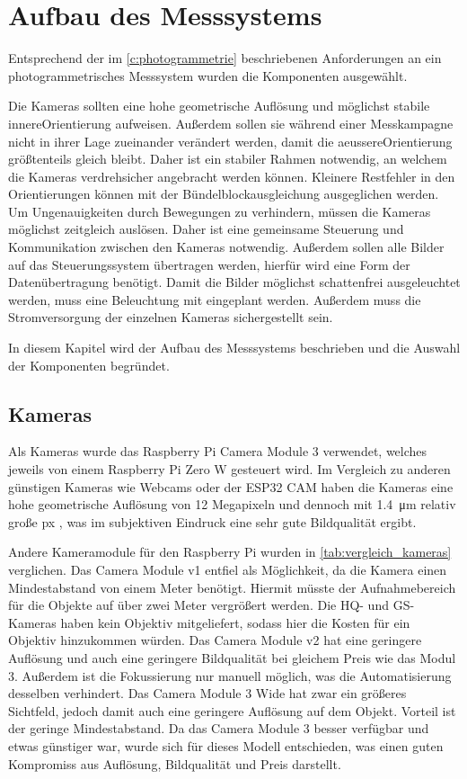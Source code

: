 \documentclass[./00PhotoBox.tex]{subfiles}
\begin{document}
\chapter{Aufbau des Messsystems}
\label{c:aufbau}
Entsprechend der im \autoref{c:photogrammetrie} beschriebenen Anforderungen an ein photogrammetrisches Messsystem wurden die Komponenten ausgewählt.

Die Kameras sollten eine hohe geometrische Auflösung und möglichst stabile \gls{innereOrientierung} aufweisen. Außerdem sollen sie während einer Messkampagne nicht in ihrer Lage zueinander verändert werden, damit die \gls{aeussereOrientierung} größtenteils gleich bleibt. Daher ist ein stabiler Rahmen notwendig, an welchem die Kameras verdrehsicher angebracht werden können. Kleinere Restfehler in den Orientierungen können mit der Bündelblockausgleichung ausgeglichen werden.
Um Ungenauigkeiten durch Bewegungen zu verhindern, müssen die Kameras möglichst zeitgleich auslösen. Daher ist eine gemeinsame Steuerung und Kommunikation zwischen den Kameras notwendig. Außerdem sollen alle Bilder auf das Steuerungssystem übertragen werden, hierfür wird eine Form der Datenübertragung benötigt. Damit die Bilder möglichst schattenfrei ausgeleuchtet werden, muss eine Beleuchtung mit eingeplant werden. Außerdem muss die Stromversorgung der einzelnen Kameras sichergestellt sein.

In diesem Kapitel wird der Aufbau des Messsystems beschrieben und die Auswahl der Komponenten begründet.

\section{Kameras}
\label{s:kameras}
Als Kameras wurde das Raspberry Pi Camera Module 3 verwendet, welches jeweils von einem Raspberry Pi Zero W gesteuert wird. Im Vergleich zu anderen günstigen Kameras wie Webcams oder der ESP32 CAM haben die Kameras eine hohe geometrische Auflösung von 12 Megapixeln und dennoch mit \SI{1,4}{\micro\metre} relativ große \acrfull{px} \citep{raspicamdatasheet}, was im subjektiven Eindruck eine sehr gute Bildqualität ergibt.

Andere Kameramodule für den Raspberry Pi wurden in \autoref{tab:vergleich_kameras} verglichen. Das Camera Module v1 entfiel als Möglichkeit, da die Kamera einen Mindestabstand von einem Meter benötigt. Hiermit müsste der Aufnahmebereich für die Objekte auf über zwei Meter vergrößert werden. Die HQ- und GS-Kameras haben kein Objektiv mitgeliefert, sodass hier die Kosten für ein Objektiv hinzukommen würden. Das Camera Module v2 hat eine geringere Auflösung und auch eine geringere Bildqualität bei gleichem Preis wie das Modul 3. Außerdem ist die Fokussierung nur manuell möglich, was die Automatisierung desselben verhindert. Das Camera Module 3 Wide hat zwar ein größeres Sichtfeld, jedoch damit auch eine geringere Auflösung auf dem Objekt. Vorteil ist der geringe Mindestabstand. Da das Camera Module 3 besser verfügbar und etwas günstiger war, wurde sich für dieses Modell entschieden, was einen guten Kompromiss aus Auflösung, Bildqualität und Preis darstellt.
\end{document}
